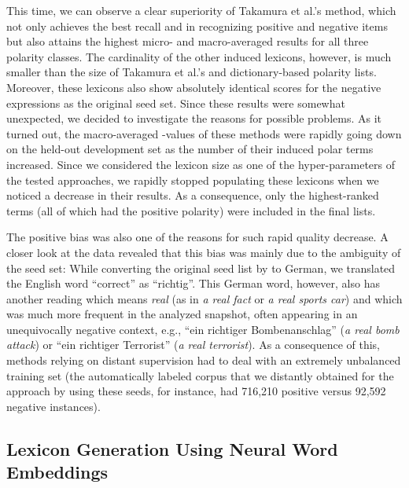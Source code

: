 This time, we can observe a clear superiority of Takamura et al.'s
method, which not only achieves the best recall and \F{} in
recognizing positive and negative items but also attains the highest
micro- and macro-averaged results for all three polarity classes.
The cardinality of the other induced lexicons, however, is much
smaller than the size of Takamura et al.'s and dictionary-based
polarity lists.  Moreover, these lexicons also show absolutely
identical scores for the negative expressions as the original seed
set.  Since these results were somewhat unexpected, we decided to
investigate the reasons for possible problems.  As it turned out, the
macro-averaged \F{}-values of these methods were rapidly going down on
the held-out development set as the number of their induced polar
terms increased.  Since we considered the lexicon size as one of the
hyper-parameters of the tested approaches, we rapidly stopped
populating these lexicons when we noticed a decrease in their results.
As a consequence, only the highest-ranked terms (all of which had the
positive polarity) were included in the final lists.

The positive bias was also one of the reasons for such rapid quality
decrease.  A closer look at the data revealed that this bias was
mainly due to the ambiguity of the seed set: While converting the
original seed list by \citet{Turney:03} to German, we translated the
English word ``correct'' as ``richtig''.  This German word, however,
also has another reading which means \emph{real} (as in \emph{a real
  fact} or \emph{a real sports car}) and which was much more frequent
in the analyzed snapshot, often appearing in an unequivocally negative
context, e.g., ``ein richtiger Bombenanschlag'' (\emph{a real bomb
  attack}) or ``ein richtiger Terrorist'' (\emph{a real terrorist}).
As a consequence of this, methods relying on distant supervision had
to deal with an extremely unbalanced training set (the automatically
labeled corpus that we distantly obtained for the approach by
\citet{Kiritchenko:14} using these seeds, for instance, had 716,210
positive versus 92,592 negative instances).

\subsection{Lexicon Generation Using Neural Word Embeddings}


